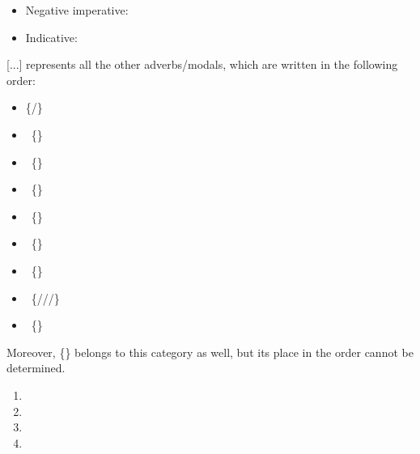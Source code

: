 \begin{refsection}
\begin{mysolution}
\begin{itemize}[noitemsep]
    \item[] Negative imperative: 
    \item[] Indicative: 
\end{itemize}

 [...] represents all the other adverbs\slash modals, which are written in the following order:
 
\begin{itemize}[noitemsep]
    \item[] \{\slash {}\}
    \item[] \rightarrow\ \{\}
    \item[] \rightarrow\ \{\}
    \item[] \rightarrow\ \{\}
    \item[] \rightarrow\ \{\}
    \item[] \rightarrow\ \{\}
    \item[] \rightarrow\ \{\}
    \item[] \rightarrow\ \{\slash {}\slash {}\slash {}\} 
    \item[] \rightarrow\ \{\}
\end{itemize}

 Moreover, \{\} belongs to this category as well, but its place in the order cannot be determined.

\begin{assgts}
    \item
    \begin{enumerate}[start = 13]

        \item {}
        \item {}
        \item {}
        \item {}
    \end{enumerate}
    \item
    \begin{enumerate}[start = 17]


\end{enumerate}
\end{assgts}
\end{mysolution}
\end{refsection}
